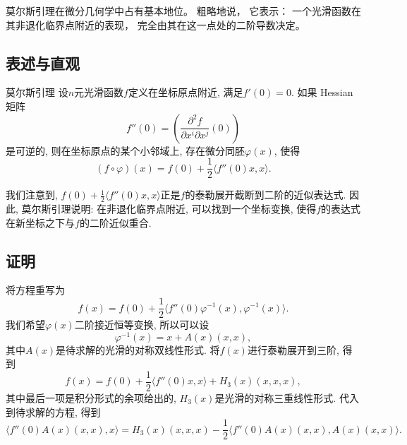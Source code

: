 
\begin{issues}
\issueTODO
\issueDraft
\end{issues}


莫尔斯引理在微分几何学中占有基本地位。 粗略地说， 它表示： 一个光滑函数在其非退化临界点附近的表现， 完全由其在这一点处的二阶导数决定。

\subsection{表述与直观}
\begin{lemma}{莫尔斯引理}
设$n$元光滑函数$f$定义在坐标原点附近, 满足$f'(0)=0$. 如果 Hessian 矩阵
$$
f''(0)=\left(\frac{\partial^2f}{\partial x^i\partial x^j}(0)\right)
$$
是可逆的, 则在坐标原点的某个小邻域上, 存在微分同胚$\varphi(x)$, 使得
$$
(f\circ\varphi)(x)=f(0)+\frac{1}{2}\langle f''(0)x,x\rangle.
$$
\end{lemma}

我们注意到, $f(0)+\frac{1}{2}\langle f''(0)x,x\rangle$正是$f$的泰勒展开截断到二阶的近似表达式. 因此, 莫尔斯引理说明: 在非退化临界点附近, 可以找到一个坐标变换, 使得$f$的表达式在新坐标之下与$f$的二阶近似重合.

\subsection{证明}
将方程重写为
$$
f(x)=f(0)+\frac{1}{2}\langle f''(0)\varphi^{-1}(x),\varphi^{-1}(x)\rangle.
$$
我们希望$\varphi(x)$二阶接近恒等变换, 所以可以设
$$
\varphi^{-1}(x)=x+A(x)(x,x),
$$
其中$A(x)$是待求解的光滑的对称双线性形式. 将$f(x)$进行泰勒展开到三阶, 得到
$$
f(x)=f(0)+\frac{1}{2}\langle f''(0)x,x\rangle+H_3(x)(x,x,x),
$$
其中最后一项是积分形式的余项给出的, $H_3(x)$是光滑的对称三重线性形式. 代入到待求解的方程, 得到
$$
\langle f''(0)A(x)(x,x),x\rangle
=H_3(x)(x,x,x)-\frac{1}{2}\langle f''(0)A(x)(x,x),A(x)(x,x)\rangle.
$$
